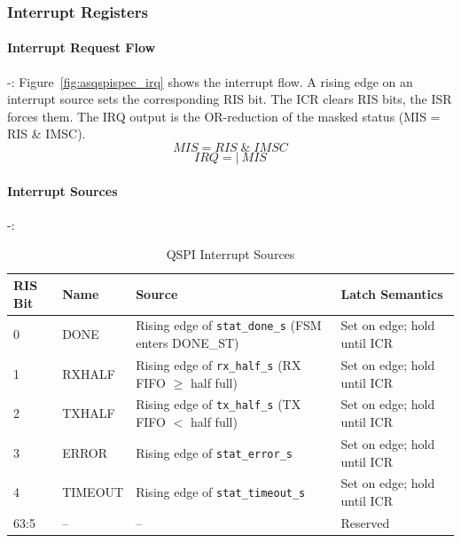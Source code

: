 \subsubsection{Interrupt Registers}

\paragraph{Interrupt Request Flow} -:
Figure~\ref{fig:asqspispec_irq} shows the interrupt flow. A rising edge on
an interrupt source sets the corresponding RIS bit. The ICR clears RIS bits,
the ISR forces them. The IRQ output is the OR-reduction of the masked
status (MIS = RIS \& IMSC).
\[
  MIS = RIS \;\&\; IMSC
\]
\[
  IRQ = |~MIS
\]

\paragraph{Interrupt Sources} -:
\begin{table}[H]
\caption{QSPI Interrupt Sources}
\label{tab:asqspispec_irqsrc}
\centering
\begin{tabularx}{\textwidth}{|l|l|X|X|}
  \hline
  RIS Bit & Name & Source & Latch Semantics \\
  \hline\hline
  0 & DONE     & Rising edge of \texttt{stat\_done\_s} (FSM enters DONE\_ST) & Set on edge; hold until ICR \\
  \hline
  1 & RXHALF   & Rising edge of \texttt{rx\_half\_s} (RX FIFO $\geq$ half full) & Set on edge; hold until ICR \\
  \hline
  2 & TXHALF   & Rising edge of \texttt{tx\_half\_s} (TX FIFO $<$ half full)   & Set on edge; hold until ICR \\
  \hline
  3 & ERROR    & Rising edge of \texttt{stat\_error\_s}                         & Set on edge; hold until ICR \\
  \hline
  4 & TIMEOUT  & Rising edge of \texttt{stat\_timeout\_s}                       & Set on edge; hold until ICR \\
  \hline
  63:5 & --   & --                                                              & Reserved \\
  \hline
\end{tabularx}
\end{table}

